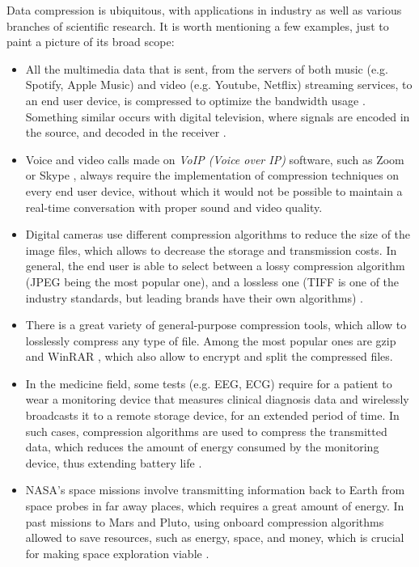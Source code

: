 Data compression is ubiquitous, with applications in industry as well as various branches of scientific research. It is worth mentioning a few examples, just to paint a picture of its broad scope:
\vspace{-5pt}
\begin{itemize}
\item All the multimedia data that is sent, from the servers of both music (e.g. Spotify, Apple Music) and video (e.g. Youtube, Netflix) streaming services, to an end user device, is compressed to optimize the bandwidth usage \cite{SpotifyApple, HEVC}. Something similar occurs with digital television, where signals are encoded in the source, and decoded in the receiver \cite{DTV}.

\item Voice and video calls made on \textit{VoIP (Voice over IP)} software, such as Zoom \cite{Zoom} or Skype \cite{Skype}, always require the implementation of compression techniques on every end user device, without which it would not be possible to maintain a real-time conversation with proper sound and video quality.

\item Digital cameras use different compression algorithms to reduce the size of the image files, which allows to decrease the storage and transmission costs. In general, the end user is able to select between a lossy compression algorithm (JPEG being the most popular one), and a lossless one (TIFF is one of the industry standards, but leading brands have their own algorithms) \cite{Nikon, Canon}. 

\item There is a great variety of general-purpose compression tools, which allow to losslessly compress any type of file. Among the most popular ones are gzip \cite{gzip} and WinRAR \cite{WinRAR}, which also allow to encrypt and split the compressed files. 

\item In the medicine field, some tests (e.g. EEG, ECG) require for a patient to wear a monitoring device that measures clinical diagnosis data and wirelessly broadcasts it to a remote storage device, for an extended period of time. In such cases, compression algorithms are used to compress the transmitted data, which reduces the amount of energy consumed by the monitoring device, thus extending battery life \cite{EEG, ECG}.

\item NASA's space missions involve transmitting information back to Earth from space probes in far away places, which requires a great amount of energy. In past missions to Mars and Pluto, using onboard compression algorithms allowed to save resources, such as energy, space, and money, which is crucial for making space exploration viable \cite{HPMars, Pluto}.


\end{itemize}
